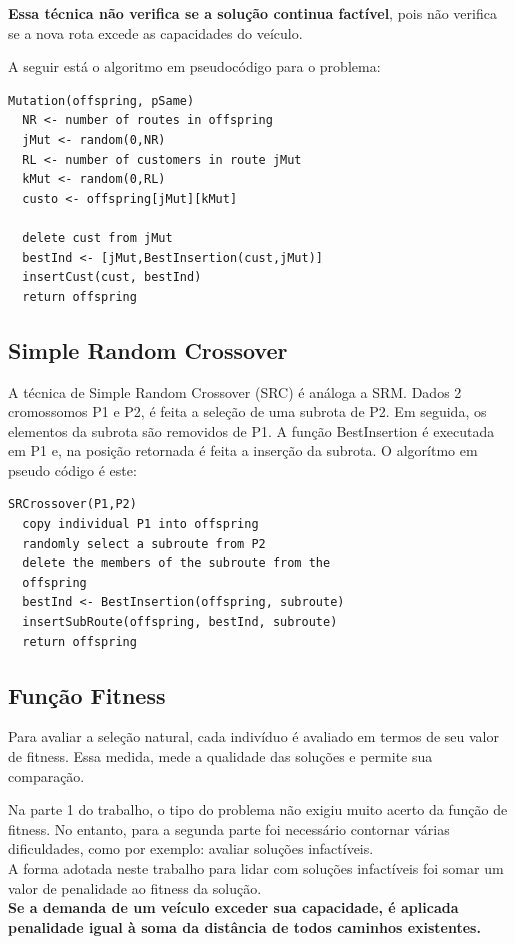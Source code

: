\documentclass[conference]{IEEEtran}
\begin{document}
\textbf{Essa técnica não verifica se a solução continua factível}, pois não verifica se a nova rota excede as capacidades do veículo.

A seguir está o algoritmo em pseudocódigo para o problema:

\newpage

\begin{verbatim}
Mutation(offspring, pSame)
  NR <- number of routes in offspring
  jMut <- random(0,NR)
  RL <- number of customers in route jMut
  kMut <- random(0,RL)
  custo <- offspring[jMut][kMut]

  delete cust from jMut
  bestInd <- [jMut,BestInsertion(cust,jMut)]
  insertCust(cust, bestInd)
  return offspring
\end{verbatim}

\subsection{Simple Random Crossover}
A técnica de Simple Random Crossover (SRC) é análoga a SRM. Dados 2 cromossomos P1 e P2, é feita a seleção de uma subrota de P2. Em seguida, os elementos da subrota são removidos de P1. A função BestInsertion é executada em P1 e, na posição retornada é feita a inserção da subrota. O algorítmo em pseudo código é este:

\begin{verbatim}
SRCrossover(P1,P2)
  copy individual P1 into offspring
  randomly select a subroute from P2
  delete the members of the subroute from the 
  offspring
  bestInd <- BestInsertion(offspring, subroute)
  insertSubRoute(offspring, bestInd, subroute)
  return offspring
\end{verbatim}

\subsection{Função Fitness}
Para avaliar a seleção natural, cada indivíduo é avaliado em termos de seu valor de fitness. Essa medida, mede a qualidade das soluções e permite sua comparação.

Na parte 1 do trabalho, o tipo do problema não exigiu muito acerto da função de fitness. No entanto, para a segunda parte foi necessário contornar várias dificuldades, como por exemplo: avaliar soluções infactíveis.\\
A forma adotada neste trabalho para lidar com soluções infactíveis foi somar um valor de penalidade ao fitness da solução.\\
\textbf{Se a demanda de um veículo exceder sua capacidade, é aplicada penalidade igual à soma da distância de todos caminhos existentes.}
\end{document}
